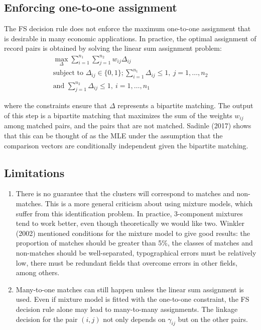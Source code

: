 \documentclass[11pt,reqno]{amsart}
\begin{document}
\subsection{Enforcing one-to-one assignment}

The FS decision rule does not enforce the maximum one-to-one assignment that is desirable in many economic applications.  In practice, the optimal assignment of record pairs is obtained by solving the linear sum assignment problem: 
\begin{gather*}
\max_{\Delta} \sum_{i=1}^{n_1}\sum_{j=1}^{n_2} w_{ij} \Delta_{ij}\\
\text{subject to } \Delta_{ij} \in \{0,1\}; \sum_{i=1}^{n_1} \Delta_{ij} \leq 1, \ j=1, \dots, n_2 \\ \text{and } \sum_{j=1}^{n_2} \Delta_{ij} \leq 1, \ i=1, \dots, n_1 
\end{gather*} 

where the constraints ensure that $\Delta$ represents a bipartite matching.  The output of this step is a bipartite matching that maximizes the sum of the weights $w_{ij}$ among matched pairs, and the pairs that are not matched.  Sadinle (2017) shows that this can be thought of as the MLE under the assumption that the comparison vectors are conditionally independent given the bipartite matching. %

\subsection{Limitations}
\begin{enumerate}
\item There is no guarantee that the clusters will correspond to matches and non-matches.  This is a more general criticism about using mixture models, which suffer from this identification problem.  In practice, 3-component mixtures tend to work better, even though theoretically we would like two.  Winkler (2002) mentioned conditions for the mixture model to give good results: the proportion of matches should be greater than 5\%, the classes of matches and non-matches should be well-separated, typographical errors must be relatively low, there must be redundant fields that overcome errors in other fields, among others. 
\item Many-to-one matches can still happen unless the linear sum assignment is used.  Even if mixture model is fitted with the one-to-one constraint, the FS decision rule alone may lead to many-to-many assignments.  The linkage decision for the pair $(i,j)$ not only depends on $\gamma_{ij}$ but on the other pairs. 
\end{enumerate}
\end{document}

